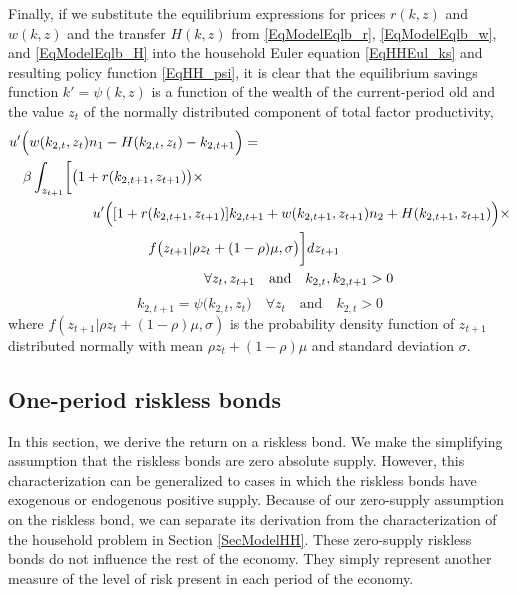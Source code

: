 \documentclass[letterpaper,12pt]{article}
\theoremstyle{definition}
\begin{document}
\begin{spacing}{1.5}
    Finally, if we substitute the equilibrium expressions for prices $r(k,z)$ and $w(k,z)$ and the transfer $H(k,z)$ from \eqref{EqModelEqlb_r}, \eqref{EqModelEqlb_w}, and \eqref{EqModelEqlb_H} into the household Euler equation \eqref{EqHHEul_ks} and resulting policy function \eqref{EqHH_psi}, it is clear that the equilibrium savings function $k'=\psi(k,z)$ is a function of the wealth of the current-period old and the value $z_t$ of the normally distributed component of total factor productivity,
    \begin{equation}\label{EqModelEqlb_Eul}
      \begin{split}
        &u'\Bigl(w(k_{2,t},z_t) n_1 - H(k_{2,t},z_t) - k_{2,t+1}\Bigr) = \\
        & \quad\beta\int_{z_{t+1}}\biggl[\bigl(1+r(k_{2,t+1},z_{t+1})\bigr)\times \\
        &\qquad\qquad\qquad u'\Bigl([1 + r(k_{2,t+1},z_{t+1})]k_{2,t+1} + w(k_{2,t+1},z_{t+1})n_2 + H(k_{2,t+1},z_{t+1})\Bigr)\times \\
        &\qquad\qquad\qquad\qquad\qquad f\bigl(z_{t+1}|\rho z_t + (1 - \rho)\mu, \sigma\bigr)\biggr]dz_{t+1} \\
        &\qquad\qquad\qquad\qquad\qquad\qquad\qquad \forall z_t, z_{t+1} \quad\text{and}\quad k_{2,t}, k_{2,t+1}>0
      \end{split}
    \end{equation}
    \begin{equation}\label{EqModelEqlb_psi}
      k_{2,t+1} = \psi\bigl(k_{2,t},z_t\bigr) \quad\forall z_t \quad\text{and}\quad k_{2,t}>0
    \end{equation}
    where $f(z_{t+1}|\rho z_t + (1-\rho)\mu,\sigma)$ is the probability density function of $z_{t+1}$ distributed normally with mean $\rho z_t + (1-\rho)\mu$ and standard deviation $\sigma$.


  \subsection{One-period riskless bonds}\label{SecModelRiskless}

    In this section, we derive the return on a riskless bond. We make the simplifying assumption that the riskless bonds are zero absolute supply. However, this characterization can be generalized to cases in which the riskless bonds have exogenous or endogenous positive supply. Because of our zero-supply assumption on the riskless bond, we can separate its derivation from the characterization of the household problem in Section \ref{SecModelHH}. These zero-supply riskless bonds do not influence the rest of the economy. They simply represent another measure of the level of risk present in each period of the economy.


\end{spacing}
\end{document}
